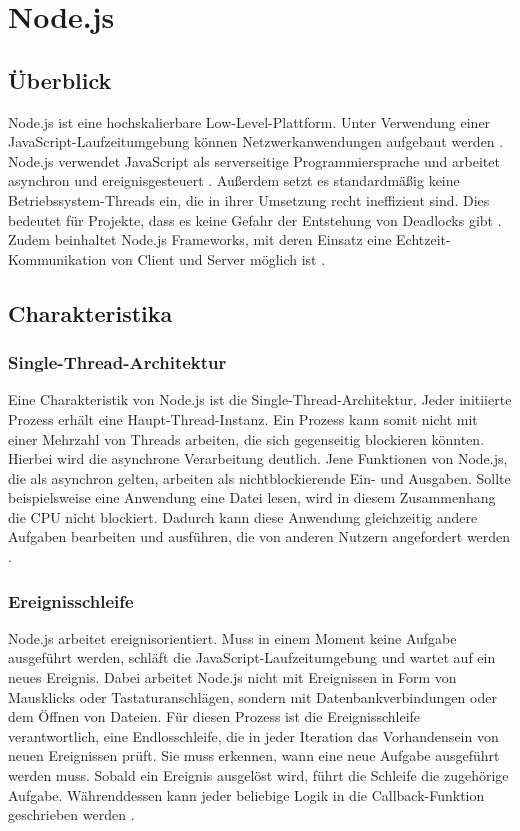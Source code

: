 \chapter{Node.js}\label{node}

\section{Überblick}
Node.js ist eine hochskalierbare Low-Level-Plattform. Unter Verwendung einer JavaScript-Laufzeitumgebung können Netzwerkanwendungen aufgebaut werden \cite[S.1]{neins}. Node.js verwendet JavaScript als serverseitige Programmiersprache \cite[S.3]{neins} und arbeitet asynchron und ereignisgesteuert \cite{nzwei}. 
Außerdem setzt es standardmäßig keine Betriebssystem-Threads ein, die in ihrer Umsetzung recht ineffizient sind. Dies bedeutet für Projekte, dass es keine Gefahr der Entstehung von Deadlocks gibt \cite{nzwei}. Zudem beinhaltet Node.js Frameworks, mit deren Einsatz eine Echtzeit-Kommunikation von Client und Server möglich ist \cite[S.3]{neins}.

\section{Charakteristika}

\subsection{Single-Thread-Architektur}
Eine Charakteristik von Node.js ist die Single-Thread-Architektur. Jeder initiierte Prozess erhält eine Haupt-Thread-Instanz. Ein Prozess kann somit nicht mit einer Mehrzahl von Threads arbeiten, die sich gegenseitig blockieren könnten. 
Hierbei wird die asynchrone Verarbeitung deutlich. Jene Funktionen von Node.js, die als asynchron gelten, arbeiten als nichtblockierende Ein- und Ausgaben. Sollte beispielsweise eine Anwendung eine Datei lesen, wird in diesem Zusammenhang die CPU nicht blockiert. Dadurch kann diese Anwendung gleichzeitig andere Aufgaben bearbeiten und ausführen, die von anderen Nutzern angefordert werden \cite[S.1]{neins}.

\subsection{Ereignisschleife}

Node.js arbeitet ereignisorientiert. Muss in einem Moment keine Aufgabe ausgeführt werden, schläft die JavaScript-Laufzeitumgebung und wartet auf ein neues Ereignis. Dabei arbeitet Node.js nicht mit Ereignissen in Form von Mausklicks oder Tastaturanschlägen, sondern mit Datenbankverbindungen oder dem Öffnen von Dateien. 
Für diesen Prozess ist die Ereignisschleife verantwortlich, eine Endlosschleife, die in jeder Iteration das Vorhandensein von neuen Ereignissen prüft. Sie muss erkennen, wann eine neue Aufgabe ausgeführt werden muss. Sobald ein Ereignis ausgelöst wird, führt die Schleife die zugehörige Aufgabe. Währenddessen kann jeder beliebige Logik in die Callback-Funktion geschrieben werden \cite[S.3]{neins}.

